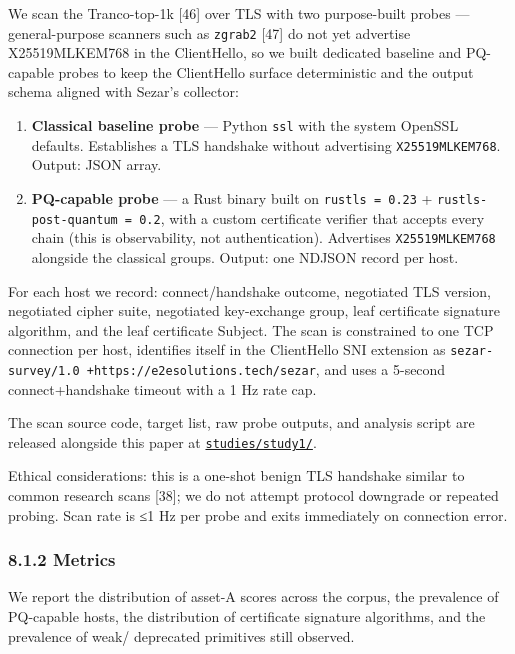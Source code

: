 We scan the Tranco-top-1k {[}46{]} over TLS with two purpose-built
probes --- general-purpose scanners such as \texttt{zgrab2} {[}47{]} do
not yet advertise X25519MLKEM768 in the ClientHello, so we built
dedicated baseline and PQ-capable probes to keep the ClientHello surface
deterministic and the output schema aligned with Sezar's collector:

\begin{enumerate}
\def\labelenumi{\arabic{enumi}.}
\tightlist
\item
  \textbf{Classical baseline probe} --- Python \texttt{ssl} with the
  system OpenSSL defaults. Establishes a TLS handshake without
  advertising \texttt{X25519MLKEM768}. Output: JSON array.
\item
  \textbf{PQ-capable probe} --- a Rust binary built on
  \texttt{rustls\ =\ 0.23} + \texttt{rustls-post-quantum\ =\ 0.2}, with
  a custom certificate verifier that accepts every chain (this is
  observability, not authentication). Advertises \texttt{X25519MLKEM768}
  alongside the classical groups. Output: one NDJSON record per host.
\end{enumerate}

For each host we record: connect/handshake outcome, negotiated TLS
version, negotiated cipher suite, negotiated key-exchange group, leaf
certificate signature algorithm, and the leaf certificate Subject. The
scan is constrained to one TCP connection per host, identifies itself in
the ClientHello SNI extension as
\texttt{sezar-survey/1.0\ +https://e2esolutions.tech/sezar}, and uses a
5-second connect+handshake timeout with a 1 Hz rate cap.

The scan source code, target list, raw probe outputs, and analysis
script are released alongside this paper at
\href{studies/study1/}{\texttt{studies/study1/}}.

Ethical considerations: this is a one-shot benign TLS handshake similar
to common research scans {[}38{]}; we do not attempt protocol downgrade
or repeated probing. Scan rate is ≤1 Hz per probe and exits immediately
on connection error.

\subsubsection{8.1.2 Metrics}\label{metrics}

We report the distribution of asset-A scores across the corpus, the
prevalence of PQ-capable hosts, the distribution of certificate
signature algorithms, and the prevalence of weak/ deprecated primitives
still observed.

